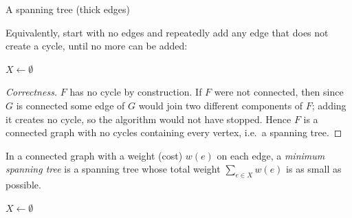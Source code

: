 \begin{center}
\end{center}
\begin{center}
\small A spanning tree (thick edges)
\end{center}

\begin{note}
Equivalently, start with no edges and repeatedly add any edge that does not create a cycle, until no more can be added:
\end{note}

\begin{algorithm}[H]
\SetAlgoLined
{}
$X\gets\emptyset$\;
\caption{Spanning tree by adding edges}
\end{algorithm}

\begin{proof}[Correctness]
$F$ has no cycle by construction. If $F$ were not connected, then since $G$ is connected some edge of $G$ would join two different components of $F$; adding it creates no cycle, so the algorithm would not have stopped. Hence $F$ is a connected graph with no cycles containing every vertex, i.e.\ a spanning tree.
\end{proof}

\bigskip
\begin{definition}
In a connected graph with a weight (cost) $w(e)$ on each edge, a \emph{minimum spanning tree} is a spanning tree whose total weight $\sum_{e\in X}w(e)$ is as small as possible.
\end{definition}

\begin{algorithm}[H]
\SetAlgoLined
{}
$X\gets\emptyset$\;
\caption{Kruskal's Greedy Algorithm}
\end{algorithm}

